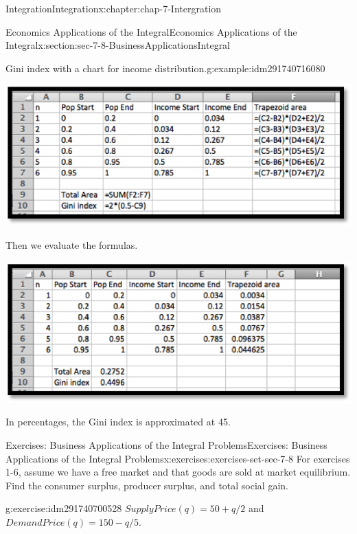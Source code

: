 \documentclass[oneside,10pt,]{book}
\numberwithin{equation}{section}
\begin{document}
\begin{chapterptx}{Integration}{}{Integration}{}{}{x:chapter:chap-7-Intergration}
\begin{sectionptx}{Economics Applications of the Integral}{}{Economics Applications of the Integral}{}{}{x:section:sec-7-8-BusinessApplicationsIntegral}
\begin{example}{Gini index with a chart for income distribution.}{g:example:idm291740716080}
\begin{sidebyside}{1}{0.2}{0.2}{0}
\begin{sbspanel}{0.6}
\includegraphics[width=\linewidth]{images/sec7-8-16.png}
\end{sbspanel}%
\end{sidebyside}%
\par
Then we evaluate the formulas.%
\begin{sidebyside}{1}{0.2}{0.2}{0}%
\begin{sbspanel}{0.6}%
\includegraphics[width=\linewidth]{images/sec7-8-17.png}
\end{sbspanel}%
\end{sidebyside}%
\par
In percentages, the Gini index is approximated at 45.%
\end{example}
%
%
\typeout{************************************************}
\typeout{************************************************}
%
\begin{exercises-subsection}{Exercises: Business Applications of the Integral Problems}{}{Exercises: Business Applications of the Integral Problems}{}{}{x:exercises:exercises-set-sec-7-8}
For exercises 1-6, assume we have a free market and that goods are sold at market equilibrium.  Find the consumer surplus, producer surplus, and total social gain.%
\begin{divisionexercise}{1}{}{}{g:exercise:idm291740700528}%
\(SupplyPrice(q)= 50+q/2\) and \(DemandPrice(q)= 150-q/5\).%
\par\smallskip%

\end{divisionexercise}
\end{exercises-subsection}
\end{sectionptx}
\end{chapterptx}
\end{document}
